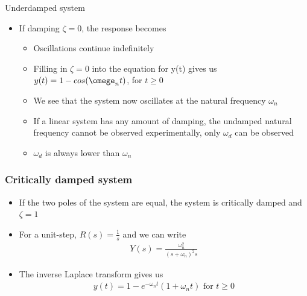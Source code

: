 \begin{frame}{Underdamped system}
\begin{itemize}
\vspace{-0.5cm}
\item If damping $\zeta=0$, the response becomes 
\begin{itemize}
\vspace{0.25cm}
\item Oscillations continue indefinitely
\vspace{0.5cm}
\item Filling in $\zeta=0$ into the equation for y(t) gives us
\\ $y(t) = 1 -cos(\omege_n t)$, for $t\ge 0$
\vspace{0.5cm}
\item We see that the system now oscillates at the natural frequency $\omega_n$
\vspace{0.5cm}
\item If a linear system has any amount of damping, the undamped natural frequency cannot be observed experimentally, only $\omega_d$ can be observed
\vspace{0.5cm}
\item $\omega_d$ is always lower than $\omega_n$
\end{itemize} 
\end{itemize}
\end{frame}

\begin{frame}
\frametitle{Critically damped system}
\begin{itemize}
\item If the two poles of the system are equal, the system is critically damped and $\zeta=1$
\item For a unit-step, $R(s)=\frac{1}{s}$ and we can write
\begin{align*}
Y(s) =\frac{\omega_n ^2}{(s+\omega_n)^2 s}
\end{align*}
\item The inverse Laplace transform gives us
\begin{align*}
y(t) = 1 - e^{-\omega_n t}(1+\omega_n t) \text{ for } t\ge 0
\end{align*}         
\end{itemize}
\end{frame}

